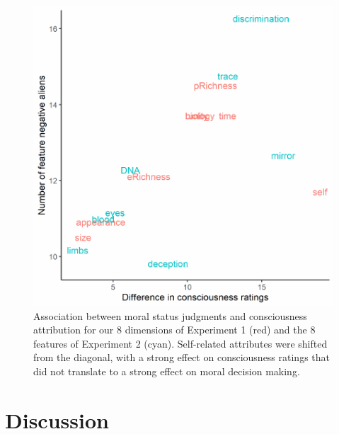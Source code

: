 \documentclass[10pt, letterpaper]{article}
\newenvironment{CodeChunk}{}{}
\begin{document}
\begin{CodeChunk}
\begin{figure}[H]

{\centering \includegraphics{figs/relation_scatter-1} 

}

\caption[Association between moral status judgments and consciousness attribution for our 8 dimensions of Experiment 1 (red) and the 8 features of Experiment 2 (cyan)]{Association between moral status judgments and consciousness attribution for our 8 dimensions of Experiment 1 (red) and the 8 features of Experiment 2 (cyan). Self-related attributes were shifted from the diagonal, with a strong effect on consciousness ratings that did not translate to a strong effect on moral decision making.}\label{fig:relation_scatter}
\end{figure}
\end{CodeChunk}

\hypertarget{discussion}{%
\section{Discussion}\label{discussion}}
\end{document}
